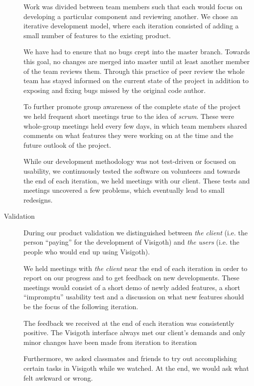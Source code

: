 \documentclass[a4paper,11pt]{article}
\begin{document}
\begin{description}
  Work was divided between team members such that each would focus on
  developing a particular component and reviewing another. We chose an
  iterative development model, where each iteration consisted of
  adding a small number of features to the existing product.

  We have had to ensure that no bugs crept into the master
  branch. Towards this goal, no changes are merged into master until
  at least another member of the team reviews them. Through this
  practice of peer review the whole team has stayed informed on the
  current state of the project in addition to exposing and fixing bugs
  missed by the original code author.

  To further promote group awareness of the complete state of the
  project we held frequent short meetings true to the idea of
  \emph{scrum}. These were whole-group meetings held every few days,
  in which team members shared comments on what features they were
  working on at the time and the future outlook of the project.

  While our development methodology was not test-driven or focused on
  usability, we continuously tested the software on volunteers and
  towards the end of each iteration, we held meetings with our
  client. These tests and meetings uncovered a few problems, which
  eventually lead to small redesigns.

\item[Validation]

  During our product validation we distinguished between \emph{the
    client} (i.e.  the person ``paying'' for the development of
  Visigoth) and \emph{the users} (i.e. the people who would end up
  using Visigoth).

  We held meetings with \emph{the client} near the end of each
  iteration in order to report on our progress and to get feedback on
  new developments. These meetings would consist of a short demo of
  newly added features, a short ``impromptu'' usability test and a
  discussion on what new features should be the focus of the following
  iteration.

  The feedback we received at the end of each iteration was
  consistently positive. The Visigoth interface always met our
  client's demands and only minor changes have been made from
  iteration to iteration

  Furthermore, we asked classmates and friends to try out
  accomplishing certain tasks in Visigoth while we watched. At the
  end, we would ask what felt awkward or wrong.


\end{description}
\end{document}
